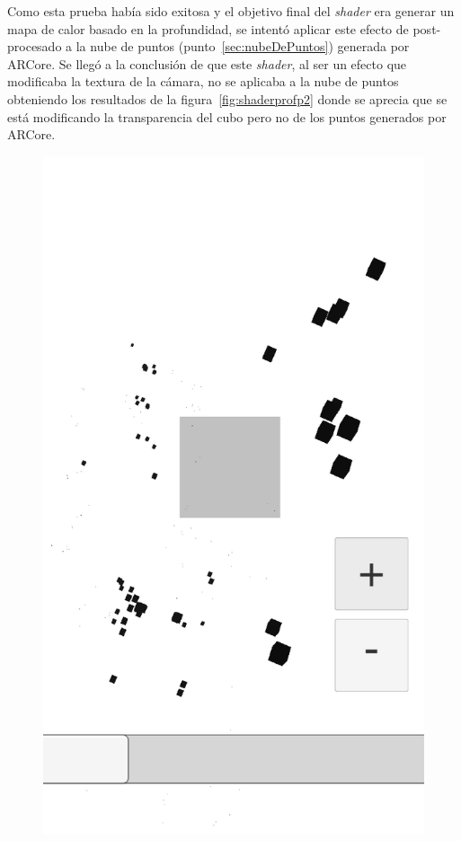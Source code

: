 Como esta prueba había sido exitosa y el objetivo final del \textit{shader} era generar un mapa de calor basado en la profundidad, se intentó aplicar este efecto de post-procesado a la nube de puntos (punto~\ref{sec:nubeDePuntos}) generada por ARCore. Se llegó a la conclusión de que este \textit{shader}, al ser un efecto que modificaba la textura de la cámara, no se aplicaba a la nube de puntos obteniendo los resultados de la figura~\ref{fig:shaderprofp2} donde se aprecia que se está modificando la transparencia del cubo pero no de los puntos generados por ARCore.

\begin{figure}[H]
\centering
    \hspace{-4mm}
    \begin{minipage}{0.5\textwidth}
        \centering
        \includegraphics[scale=0.2]{Images/Shaders/profundidad (4).png}\\

\end{minipage}
\end{figure}

